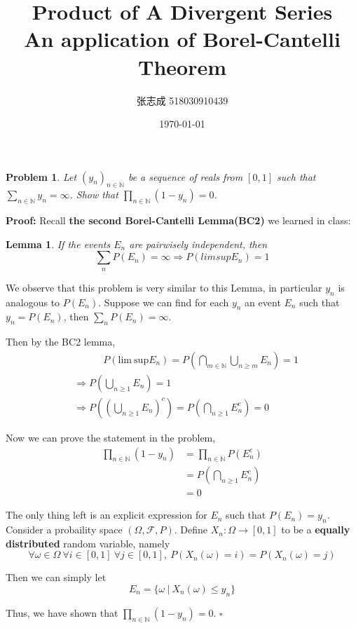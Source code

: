 \documentclass[UTF8, 12pt]{ctexart}
\title{Product of A Divergent Series \\ \large An application of Borel-Cantelli Theorem}
\author{张志成 518030910439}
\date{\today}
\newenvironment{proof}{\noindent\ignorespaces\textbf{Proof:}}{\hfill $\square$\par\noindent}
\newtheorem*{lemma*}{Lemma}
\newtheorem*{problem*}{Problem}
\begin{document}
    \maketitle
    \begin{problem*}
        Let $(y_n)_{n\in\mathbb{N}}$ be a sequence of reals from $[0,1]$ such that $\sum_{n\in\mathbb{N}}y_n = \infty$.
        Show that $\prod_{n\in\mathbb{N}}(1-y_n) = 0$.
    \end{problem*}

    \begin{proof}
        Recall \textbf{the second Borel-Cantelli Lemma(BC2)} we learned in class: 
        \begin{lemma*}
            If the events $E_n$ are pairwisely independent, then $$ \sum_n P(E_n) = \infty \Longrightarrow P(lim sup E_n) = 1 $$
        \end{lemma*} \par
        We observe that this problem is very similar to this Lemma, in particular $y_n$ is analogous to $P(E_n)$. Suppose we can find
        for each $y_n$ an event $E_n$ such that $y_n = P(E_n)$, then $\sum_n P(E_n) = \infty$.
        
        Then by the BC2 lemma, 
        \begin{align*}
            &\quad\quad\quad P(\text{lim}\ \text{sup} E_n) = P(\bigcap_{m\in\mathbb{N}}\bigcup_{n\geq m} E_n) = 1 \\
            &\Longrightarrow P(\bigcup_{n\geq 1} E_n) = 1 \\
            &\Longrightarrow P((\bigcup_{n\geq 1} E_n)^c) = P(\bigcap_{n\geq 1} E_n^c) = 0
        \end{align*}

        Now we can prove the statement in the problem,
        \begin{align*}
            \prod_{n\in\mathbb{N}}(1-y_n) &= \prod_{n\in\mathbb{N}}P(E_n^c)\\
            &= P(\bigcap_{n\geq 1} E_n^c) \\
            &= 0
        \end{align*}

        The only thing left is an explicit expression for $E_n$ such that $P(E_n) = y_n$.
        Consider a probaility space $(\Omega, \mathcal{F}, P)$.
        Define $X_n: \Omega \rightarrow [0,1]$ to be a \textbf{equally distributed} random variable, namely
        $$ \forall \omega \in \Omega\ \forall i\in[0,1]\ \forall j\in[0,1],\ P(X_n(\omega) = i) = P(X_n(\omega) = j) $$

        Then we can simply let $$ E_n = \{\omega\ |\ X_n(\omega) \leq y_n \} $$

        Thus, we have shown that $\prod_{n\in\mathbb{N}}(1-y_n) = 0$.
    \end{proof}
\end{document}
